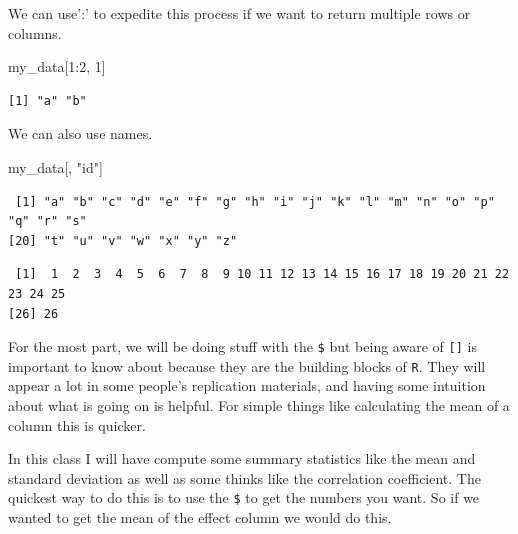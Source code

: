 \documentclass[
  letterpaper,
  DIV=11,
  numbers=noendperiod,
  oneside]{scrreprt}
\newenvironment{Shaded}{\begin{snugshade}}{\end{snugshade}}
\newcommand{\DecValTok}[1]{\textcolor[rgb]{0.68,0.00,0.00}{#1}}
\newcommand{\NormalTok}[1]{\textcolor[rgb]{0.00,0.23,0.31}{#1}}
\newcommand{\SpecialCharTok}[1]{\textcolor[rgb]{0.37,0.37,0.37}{#1}}
\newcommand{\StringTok}[1]{\textcolor[rgb]{0.13,0.47,0.30}{#1}}
\begin{document}
We can use':' to expedite this process if we want to return multiple
rows or columns.

\begin{Shaded}
\begin{Highlighting}[]
\NormalTok{my\_data[}\DecValTok{1}\SpecialCharTok{:}\DecValTok{2}\NormalTok{, }\DecValTok{1}\NormalTok{]}
\end{Highlighting}
\end{Shaded}

\begin{verbatim}
[1] "a" "b"
\end{verbatim}

We can also use names.

\begin{Shaded}
\begin{Highlighting}[]
\NormalTok{my\_data[, }\StringTok{"id"}\NormalTok{]}
\end{Highlighting}
\end{Shaded}

\begin{verbatim}
 [1] "a" "b" "c" "d" "e" "f" "g" "h" "i" "j" "k" "l" "m" "n" "o" "p" "q" "r" "s"
[20] "t" "u" "v" "w" "x" "y" "z"
\end{verbatim}

\begin{Shaded}
\end{Shaded}

\begin{verbatim}
 [1]  1  2  3  4  5  6  7  8  9 10 11 12 13 14 15 16 17 18 19 20 21 22 23 24 25
[26] 26
\end{verbatim}

For the most part, we will be doing stuff with the \texttt{\$} but being
aware of \texttt{{[}{]}} is important to know about because they are the
building blocks of \texttt{R}. They will appear a lot in some people's
replication materials, and having some intuition about what is going on
is helpful. For simple things like calculating the mean of a column this
is quicker.

In this class I will have compute some summary statistics like the mean
and standard deviation as well as some thinks like the correlation
coefficient. The quickest way to do this is to use the \texttt{\$} to
get the numbers you want. So if we wanted to get the mean of the effect
column we would do this.
\end{document}
